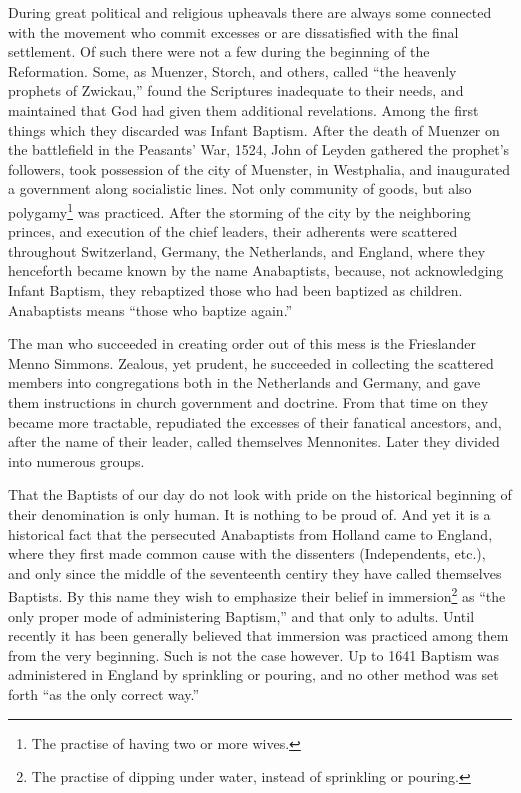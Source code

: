 \documentclass[
]{book}
\begin{document}
During great political and religious upheavals there are always some connected with the movement who commit excesses or are dissatisfied with the final settlement. Of such there were not a few during the beginning of the Reformation. Some, as Muenzer, Storch, and others, called ``the heavenly prophets of Zwickau,'' found the Scriptures inadequate to their needs, and maintained that God had given them additional revelations. Among the first things which they discarded was Infant Baptism. After the death of Muenzer on the battlefield in the Peasants' War, 1524, John of Leyden gathered the prophet's followers, took possession of the city of Muenster, in Westphalia, and inaugurated a government along socialistic lines. Not only community of goods, but also polygamy\footnote{The practise of having two or more wives.} was practiced. After the storming of the city by the neighboring princes, and execution of the chief leaders, their adherents were scattered throughout Switzerland, Germany, the Netherlands, and England, where they henceforth became known by the name Anabaptists, because, not acknowledging Infant Baptism, they rebaptized those who had been baptized as children. Anabaptists means ``those who baptize again.''

The man who succeeded in creating order out of this mess is the Frieslander Menno Simmons. Zealous, yet prudent, he succeeded in collecting the scattered members into congregations both in the Netherlands and Germany, and gave them instructions in church government and doctrine. From that time on they became more tractable, repudiated the excesses of their fanatical ancestors, and, after the name of their leader, called themselves Mennonites. Later they divided into numerous groups.

That the Baptists of our day do not look with pride on the historical beginning of their denomination is only human. It is nothing to be proud of. And yet it is a historical fact that the persecuted Anabaptists from Holland came to England, where they first made common cause with the dissenters (Independents, etc.), and only since the middle of the seventeenth centiry they have called themselves Baptists. By this name they wish to emphasize their belief in immersion\footnote{The practise of dipping under water, instead of sprinkling or pouring.} as ``the only proper mode of administering Baptism,'' and that only to adults. Until recently it has been generally believed that immersion was practiced among them from the very beginning. Such is not the case however. Up to 1641 Baptism was administered in England by sprinkling or pouring, and no other method was set forth ``as the only correct way.''
\end{document}
